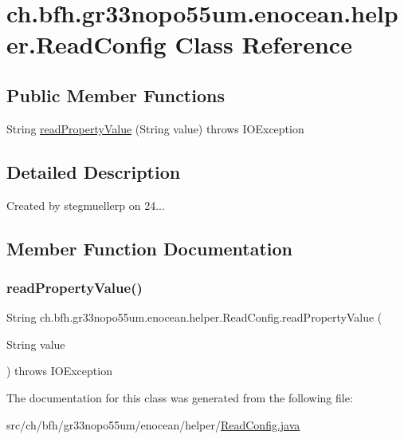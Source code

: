 \hypertarget{classch_1_1bfh_1_1gr33nopo55um_1_1enocean_1_1helper_1_1_read_config}{}\section{ch.\+bfh.\+gr33nopo55um.\+enocean.\+helper.\+Read\+Config Class Reference}
\label{classch_1_1bfh_1_1gr33nopo55um_1_1enocean_1_1helper_1_1_read_config}
\subsection*{Public Member Functions}
\begin{DoxyCompactItemize}
\item 
String \hyperlink{classch_1_1bfh_1_1gr33nopo55um_1_1enocean_1_1helper_1_1_read_config_a82f35919ac8f752ee8ef47fb1de620e4}{read\+Property\+Value} (String value)  throws I\+O\+Exception 
\end{DoxyCompactItemize}


\subsection{Detailed Description}
Created by stegmuellerp on 24... 

\subsection{Member Function Documentation}
\hypertarget{classch_1_1bfh_1_1gr33nopo55um_1_1enocean_1_1helper_1_1_read_config_a82f35919ac8f752ee8ef47fb1de620e4}{}\label{classch_1_1bfh_1_1gr33nopo55um_1_1enocean_1_1helper_1_1_read_config_a82f35919ac8f752ee8ef47fb1de620e4} 
\subsubsection{\texorpdfstring{read\+Property\+Value()}{readPropertyValue()}}
{\footnotesize\ttfamily String ch.\+bfh.\+gr33nopo55um.\+enocean.\+helper.\+Read\+Config.\+read\+Property\+Value (\begin{DoxyParamCaption}\item[{String}]{value }\end{DoxyParamCaption}) throws I\+O\+Exception}



The documentation for this class was generated from the following file\+:\begin{DoxyCompactItemize}
\item 
src/ch/bfh/gr33nopo55um/enocean/helper/\hyperlink{_read_config_8java}{Read\+Config.\+java}\end{DoxyCompactItemize}
